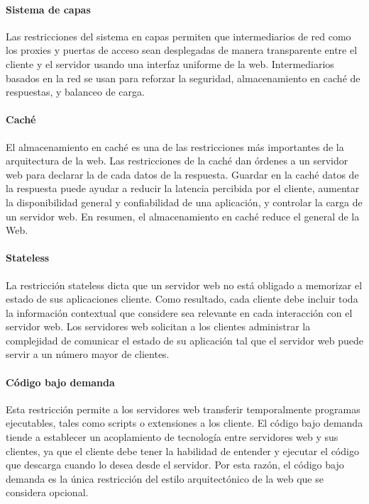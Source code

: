 \paragraph{Sistema de capas}
\label{\detokenize{chapter_one/rest:sistema-de-capas}}
Las restricciones del sistema en capas permiten que intermediarios de red como
los proxies y puertas de acceso sean desplegadas de manera transparente entre el cliente
y el servidor usando una interfaz uniforme de la web. Intermediarios basados
en la red se usan para reforzar la seguridad, almacenamiento en caché de
respuestas, y balanceo de carga.


\paragraph{Caché}
\label{\detokenize{chapter_one/rest:cache}}
El almacenamiento en caché es una de las restricciones más importantes de la
arquitectura de la web. Las restricciones de la caché dan órdenes a un servidor
web para declarar la  de cada datos de la respuesta.
Guardar en la caché datos de la respuesta puede ayudar a reducir
la latencia percibida por el cliente, aumentar la disponibilidad
general y confiabilidad de una aplicación, y controlar la carga
de un servidor web. En resumen, el almacenamiento en caché
reduce el  general de la Web.


\paragraph{Stateless}
\label{\detokenize{chapter_one/rest:stateless}}
La restricción stateless dicta que un servidor web no está obligado
a memorizar el estado de sus aplicaciones cliente. Como resultado,
cada cliente debe incluir toda la información contextual que considere
sea relevante en cada interacción con el servidor web. Los servidores
web solicitan a los clientes administrar la complejidad de comunicar
el estado de su aplicación tal que el servidor web puede servir a un número
mayor de clientes.


\paragraph{Código bajo demanda}
\label{\detokenize{chapter_one/rest:codigo-bajo-demanda}}
Esta restricción permite a los servidores web transferir temporalmente
programas ejecutables, tales como scripts o extensiones a los cliente.
El código bajo demanda tiende a establecer un acoplamiento de tecnología
entre servidores web y sus clientes, ya que el cliente debe tener la habilidad
de entender y ejecutar el código que descarga cuando lo desea desde el servidor.
Por esta razón, el código bajo demanda es la única restricción del
estilo arquitectónico de la web que se considera opcional.


